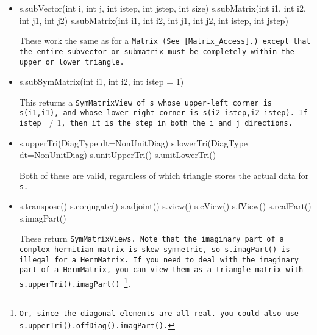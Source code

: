 \begin{itemize}
\item
\begin{tmvcode}
s.subVector(int i, int j, int istep, int jstep, int size)
s.subMatrix(int i1, int i2, int j1, int j2)
s.subMatrix(int i1, int i2, int j1, int j2, int istep, int jstep)
\end{tmvcode}
These work the same as for a \tt{Matrix}
(See \ref{Matrix_Access}.)
except that the entire
subvector or submatrix must be completely within the upper or lower triangle.

\item
\begin{tmvcode}
s.subSymMatrix(int i1, int i2, int istep = 1)
\end{tmvcode}
This returns a \tt{SymMatrixView} of \tt{s} whose upper-left
corner is \tt{s(i1,i1)}, and whose lower-right corner is 
\tt{s(i2-istep,i2-istep)}.  If \tt{istep} $\neq 1$, then it is the 
step in both the \tt{i} and \tt{j} directions.

\item
\begin{tmvcode}
s.upperTri(DiagType dt=NonUnitDiag)
s.lowerTri(DiagType dt=NonUnitDiag)
s.unitUpperTri()
s.unitLowerTri()
\end{tmvcode}
Both of these are valid, regardless
of which triangle stores the actual data for \tt{s}.

\item
\begin{tmvcode}
s.transpose()
s.conjugate()
s.adjoint()
s.view()
s.cView()
s.fView()
s.realPart()
s.imagPart()
\end{tmvcode}
These return \tt{SymMatrixView}s.
Note that the imaginary part of a complex hermitian matrix is skew-symmetric,
so \tt{s.imagPart()} is illegal for a \tt{HermMatrix}.  If you need to
deal with the imaginary part of a \tt{HermMatrix},
you can view them as a triangle matrix with \tt{s.upperTri().imagPart()}
\footnote{Or, 
since the diagonal elements are all real.
you could also use \tt{s.upperTri().offDiag().imagPart()}.}.

\end{itemize}


